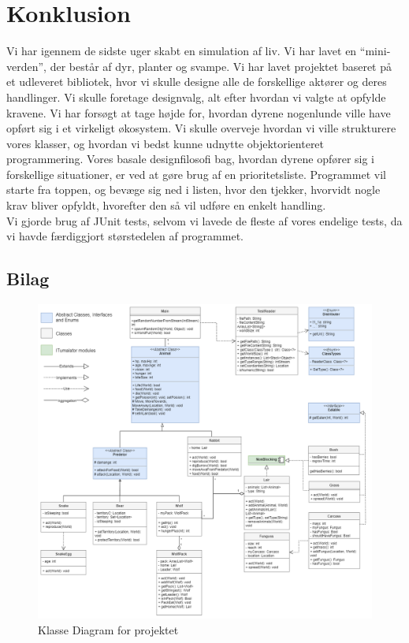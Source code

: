 \documentclass[12pt]{article}
\begin{document}
    \section{Konklusion}
    Vi har igennem de sidste uger skabt en simulation af liv. Vi har lavet en “mini-verden”, der består af dyr, planter og svampe. Vi har lavet projektet baseret på et udleveret bibliotek, hvor vi skulle designe alle de forskellige aktører og deres handlinger. Vi skulle foretage designvalg, alt efter hvordan vi valgte at opfylde kravene. Vi har forsøgt at tage højde for, hvordan dyrene nogenlunde ville have opført sig i et virkeligt økosystem. Vi skulle overveje hvordan vi ville strukturere vores klasser, og hvordan vi bedst kunne udnytte objektorienteret programmering. Vores basale designfilosofi bag, hvordan dyrene opfører sig i forskellige situationer, er ved at gøre brug af en prioritetsliste. Programmet vil starte fra toppen, og bevæge sig ned i listen, hvor den tjekker, hvorvidt nogle krav bliver opfyldt, hvorefter den så vil udføre en enkelt handling. 
    \\Vi gjorde brug af JUnit tests, selvom vi lavede de fleste af vores endelige tests, da vi havde færdiggjort størstedelen af programmet. 
    \newpage
    \begin{landscape}
        \thispagestyle{empty}
        \section{Bilag}
    \begin{figure}[H]
        \centering
        \includegraphics[width=0.6\columnwidth]{../ClassDiagram.png}
        \caption{Klasse Diagram for projektet}
    \end{figure}
    \end{landscape}
\end{document}
